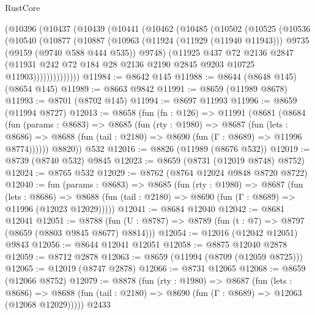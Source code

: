 \begin{lexlean}{RustCore}
\begin{coremodule}
    (@10396
      (@10437
        (@10439
          (@10441
            (@10462
              (@10485
                (@10502
                  (@10525
                    (@10536
                      (@10540
                        (@10877
                          (@10887
                            (@10963
                              (@11924 (@11929 (@11940 @11943)))
                              @9735
                              (@9159 (@9740 @588 @444 @535))
                              @9748)
                            (@11925
                              @437
                              @72
                              @2136
                              @2847
                              (@11931
                                @242
                                @72
                                @184
                                @28
                                @2136
                                @2190
                                @2845
                                @9203
                                @10725
                                @11903))))))))))))))
@11984 := @8642 @145
@11988 := @8644 (@8648 @145) (@8654 @145)
@11989 := @8663 @9842
@11991 := @8659 (@11989 @8678)
@11993 := @8701 (@8702 @145)
@11994 := @8697 @11993
@11996 := @8659 (@11994 @8727)
@12013 := @8658
    (fun (fn : @126) =>
    @11991
      (@8681
        (@8684
          (fun (params : @8683) =>
          @8685
            (fun (rty : @1980) =>
            @8687
              (fun (lets : @8686) =>
              @8688 (fun (tail : @2180) => @8690 (fun (Γ : @8689) => @11996 @8774))))))
        @8820))
    @532
@12016 := @8826 (@11989 (@8676 @532))
@12019 := @8739 (@8740 @532) @9845
@12023 := @8659 (@8731 (@12019 @8748) @8752)
@12024 := @8765 @532
@12029 := @8762 (@8764 @12024 @9848 @8720 @8722)
@12040 := fun (params : @8683) =>
  @8685
    (fun (rty : @1980) =>
    @8687
      (fun (lets : @8686) =>
      @8688 (fun (tail : @2180) => @8690 (fun (Γ : @8689) => @11996 (@12023 @12029)))))
@12041 := @8684 @12040
@12042 := @8681 @12041
@12051 := @8788 (fun (U : @8787) => @8789 (fun (t : @7) => @8797 (@8659 (@8803 @9845 @8677) @8814)))
@12054 := @12016 (@12042 @12051) @9843
@12056 := @8644 @12041 @12051
@12058 := @8875 @12040 @2878
@12059 := @8712 @2878
@12063 := @8659 (@11994 (@8709 (@12059 @8725)))
@12065 := @12019 (@8747 @2878)
@12066 := @8731 @12065
@12068 := @8659 (@12066 @8752)
@12079 := @8878
    (fun (rty : @1980) =>
    @8687
      (fun (lets : @8686) =>
      @8688 (fun (tail : @2180) => @8690 (fun (Γ : @8689) => @12063 (@12068 @12029)))))
    @2433

\end{coremodule}
\end{lexlean}
